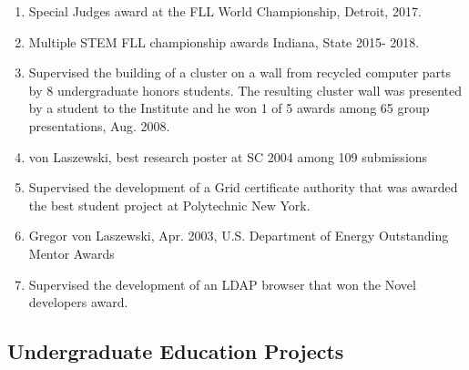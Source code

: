 \documentclass{article}
\renewcommand{\url}[1]{\href{#1}{\faExternalLink}}
\begin{document}
\begin{enumerate}
\item  Special Judges award at the FLL World Championship, Detroit, 2017.
\item  Multiple STEM FLL championship awards Indiana, State 2015- 2018.
\item  Supervised the building of a cluster on a wall from recycled computer parts by 8 undergraduate honors students. The resulting cluster wall was presented by a student to the Institute and he won 1 of 5 awards among 65 group presentations, Aug. 2008.
\item  von Laszewski, best research poster at SC 2004 among 109 submissions 
\item  Supervised the development of a Grid certificate authority that was awarded the best student project at Polytechnic New York. 
\item  Gregor von Laszewski, Apr. 2003, U.S. Department of Energy Outstanding Mentor Awards \url{http://www.anl.gov/Media_Center/Argonne_News/2004/an040112.html} 
\item  Supervised the development of an LDAP browser that won the Novel developers award.
\end{enumerate}
    
\subsection{Undergraduate Education Projects}
\end{document}
